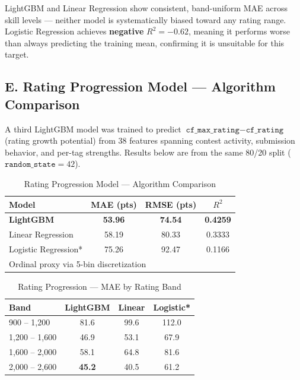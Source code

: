\documentclass[12pt,a4paper]{article}
\begin{document}
LightGBM and Linear Regression show consistent, band-uniform MAE across skill
levels — neither model is systematically biased toward any rating range.
Logistic Regression achieves \textbf{negative} $R^2 = -0.62$, meaning it
performs worse than always predicting the training mean, confirming it is
unsuitable for this target.
 
\subsection*{E. Rating Progression Model — Algorithm Comparison}
 
A third LightGBM model was trained to predict
$\texttt{cf\_max\_rating} - \texttt{cf\_rating}$ (rating growth potential)
from 38 features spanning contest activity, submission behavior, and per-tag
strengths. Results below are from the same 80/20 split ($\texttt{random\_state}=42$).
 
\begin{table}[H]
\centering
\caption{Rating Progression Model — Algorithm Comparison}
\begin{tabular}{|l|c|c|c|}
\hline
\textbf{Model} & \textbf{MAE (pts)} & \textbf{RMSE (pts)} & \textbf{$R^2$} \\
\hline
\textbf{LightGBM} & \textbf{53.96} & \textbf{74.54} & \textbf{0.4259} \\
Linear Regression & 58.19 & 80.33 & 0.3333 \\
Logistic Regression* & 75.26 & 92.47 & 0.1166 \\
\hline
\multicolumn{4}{l}{\small * Ordinal proxy via 5-bin discretization} \\
\end{tabular}
\end{table}
 
\begin{table}[H]
\centering
\caption{Rating Progression — MAE by Rating Band}
\begin{tabular}{|l|c|c|c|}
\hline
\textbf{Band} & \textbf{LightGBM} & \textbf{Linear} & \textbf{Logistic*} \\
\hline
900 – 1{,}200   & 81.6 & 99.6 & 112.0 \\
1{,}200 – 1{,}600 & 46.9 & 53.1 & 67.9 \\
1{,}600 – 2{,}000 & 58.1 & 64.8 & 81.6 \\
2{,}000 – 2{,}600 & \textbf{45.2} & 40.5 & 61.2 \\
\hline
\end{tabular}
\end{table}
 
\end{document}

